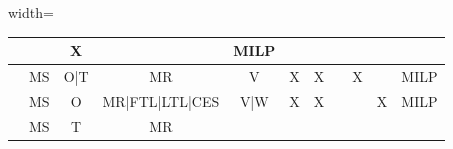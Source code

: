 \begin{table}[h!]
\begin{adjustbox}{width=\textwidth}
\begin{tabular}{|c|c|c|c|c|c|c|l|c|c|c|}
                                                                                         &                & X
                                                                                         &
                                                                                         & MILP
      \\ \hline
      \autocite{Chitsaz2019ARouting}                                                     &
      MS                                                                                 &
      O|T                                                                                &
      MR                                                                                 &
      V                                                                                  &
      X                                                                                  &
      X                                                                                  &                &
      X                                                                                  &
                                                                                         &
      MILP                                                                                                                                              \\ \hline
      \autocite{Baller2022OptimizingApproach}                                            & MS
                                                                                         & O
                                                                                         & MR|FTL|LTL|CES
                                                                                         & V|W
                                                                                         & X
                                                                                         & X
                                                                                         &                &
                                                                                         & X
                                                                                         & MILP
      \\ \hline
      \autocite{Hashemi-Amiri2023IntegratedApproach}                                     &
      MS                                                                                 &
      T                                                                                  &
      MR                                                                                 &

\end{tabular}
\end{adjustbox}
\end{table}
